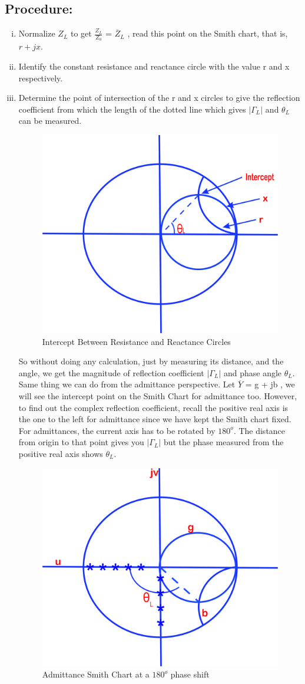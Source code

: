 \subsection*{Procedure:}
\begin{enumerate}[(i)]
\item Normalize $Z_{L}$ to get $\frac{Z_{L}}{Z_{0}}$ = $\overline{Z}_{L}$ , read this point on the Smith chart, that is,  $r+jx$.
\item Identify the constant resistance and reactance circle with the value r and x respectively.
\item Determine the point of intersection of the r and x circles to give the reflection coefficient from which the length of the dotted line which gives $|\Gamma_L|$ and $\theta_L$ can be measured.
\begin{figure}[h]
\centering
\includegraphics[width=0.6\linewidth]{./graphics/lfds}
\caption{Intercept Between Resistance and Reactance Circles}
\label{fig:lfds}
\end{figure}

So without doing any calculation, just by measuring its distance, and the angle, we get the magnitude of reflection coefficient   $|\Gamma_L|$
and phase angle $\theta_L$. Same thing we can do from the admittance perspective. Let $\overline{Y}$ = g + jb , we will see the intercept point on the Smith Chart for admittance too. However, to find out the complex reflection coefficient, recall the positive real axis is the one to the left for admittance since we have kept the Smith chart fixed. For admittances, the current axis has to be rotated by $180^o$. The distance from origin to that point gives you  $|\Gamma_L|$ but the phase measured from the  positive real axis shows $\theta_L$. 
\begin{figure}[h]
\centering
\includegraphics[width=0.6\linewidth]{./graphics/KJHGFDS}
\caption{Admittance Smith Chart at a $180^o$ phase shift}
\label{fig:kjhgfds}
\end{figure}


\end{enumerate}
